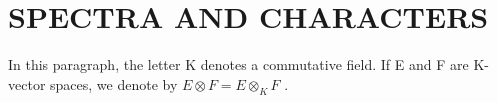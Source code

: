 \section{SPECTRA AND CHARACTERS}

In this paragraph, the letter K denotes a commutative field. If E and F are K-vector spaces, we denote by \(E \otimes F = E \otimes_{K} F\) .

